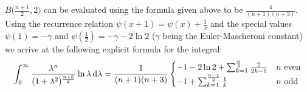 $B\bigl(\tfrac{n+1}{2}, 2\bigr)$ can be evaluated using the formula given above
to be $\tfrac{4}{(n+1)(n+3)}$. Using the recurrence relation $\psi(x + 1) =
\psi(x) + \tfrac{1}{x}$ and the special values $\psi(1) = -\gamma$ and
$\psi(\tfrac{1}{2}) = -\gamma - 2\ln 2$ ($\gamma$ being the Euler-Mascheroni
constant) we arrive at the following explicit formula for the integral:
\begin{align*}
    \Integ[\infty]{0}{\lambda}{\frac{\lambda^n}{(1 +
    \lambda^2)^{\frac{n+5}{2}}}\ln{\lambda}} = \frac{1}{(n+1)(n+3)}
        \begin{cases} 
            -1 - 2\ln 2 + \sum_{k=1}^{\frac n 2}\frac{2}{2k - 1} & n\text{
            even} \\
            -1 + \sum_{k=1}^{\frac{n-1}{2}}\frac 1 k & n\text{ odd}
        \end{cases}
\end{align*}
